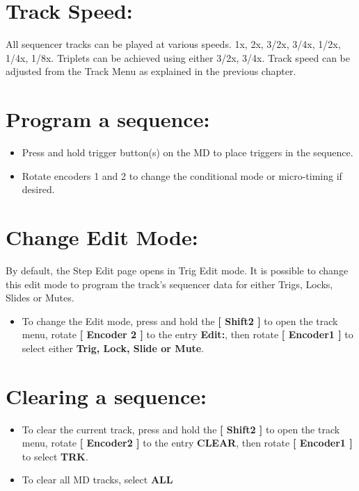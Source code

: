 \vspace{-0.3cm}

\section{Track Speed:}
All sequencer tracks can be played at various speeds. 1x, 2x, 3/2x, 3/4x, 1/2x, 1/4x, 1/8x. Triplets can be achieved using either 3/2x, 3/4x. 
Track speed can be adjusted from the Track Menu as explained in the previous chapter.

\section{Program a sequence:}
\begin{itemize}
\item Press and hold trigger button(s) on the MD to place triggers in the sequence.
\item Rotate encoders 1 and 2 to change the conditional mode or micro-timing if desired.
\end{itemize}

\section{Change Edit Mode:}
By default, the Step Edit page opens in Trig Edit mode. It is possible to change this edit mode to program the track's sequencer data for either Trigs, Locks, Slides or Mutes.
\begin{itemize}
\item To change the Edit mode, press and hold the\textbf{ [ Shift2 ]} to open the track menu, rotate \textbf{[ Encoder 2 ]} to the entry \textbf{Edit:}, then rotate \textbf{[ Encoder1 ]} to select either \textbf{Trig, Lock, Slide or Mute}.
\end{itemize}
\vspace{-0.3cm}

\section{Clearing a sequence:}
\begin{itemize}
\item To clear the current track, press and hold the\textbf{ [ Shift2 ]} to open the track menu, rotate \textbf{[ Encoder2 ]} to the entry \textbf{CLEAR}, then rotate \textbf{[ Encoder1 ]} to select \textbf{TRK}.
\item To clear all MD tracks, select \textbf{ALL}
\end{itemize}

